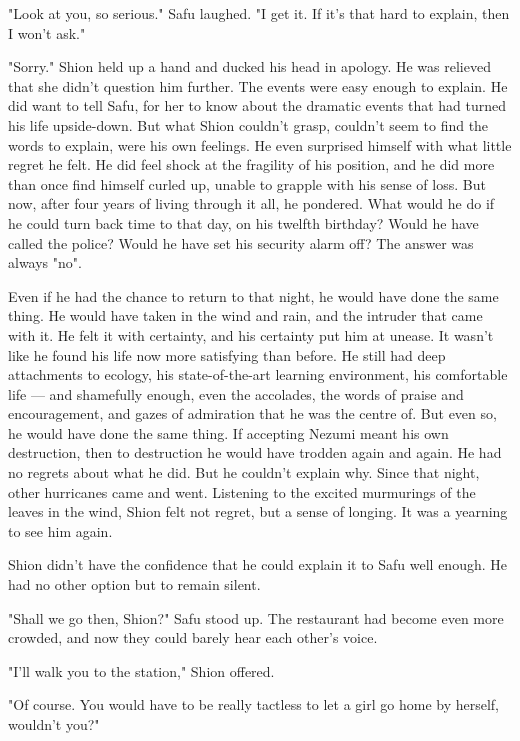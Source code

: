 \myspace

"Look at you, so serious." Safu laughed. "I get it. If it's that hard to
explain, then I won't ask."

"Sorry." Shion held up a hand and ducked his head in apology. He was
relieved that she didn't question him further. The events were easy
enough to explain. He did want to tell Safu, for her to know about the
dramatic events that had turned his life upside-down. But what Shion
couldn't grasp, couldn't seem to find the words to explain, were his own
feelings. He even surprised himself with what little regret he felt. He
did feel shock at the fragility of his position, and he did more than
once find himself curled up, unable to grapple with his sense of loss.
But now, after four years of living through it all, he pondered. What
would he do if he could turn back time to that day, on his twelfth
birthday? Would he have called the police? Would he have set his
security alarm off? The answer was always "no".~

Even if he had the chance to return to that night, he would have done
the same thing. He would have taken in the wind and rain, and the
intruder that came with it. He felt it with certainty, and his certainty
put him at unease. It wasn't like he found his life now more satisfying
than before. He still had deep attachments to ecology, his
state-of-the-art learning environment, his comfortable life --- and
shamefully enough, even the accolades, the words of praise and
encouragement, and gazes of admiration that he was the centre of. But
even so, he would have done the same thing. If accepting Nezumi meant
his own destruction, then to destruction he would have trodden again and
again. He had no regrets about what he did. But he couldn't explain why.
Since that night, other hurricanes came and went. Listening to the
excited murmurings of the leaves in the wind, Shion felt not regret, but
a sense of longing. It was a yearning to see him again.

Shion didn't have the confidence that he could explain it to Safu well
enough. He had no other option but to remain silent.

"Shall we go then, Shion?" Safu stood up. The restaurant had become even
more crowded, and now they could barely hear each other's voice.

"I'll walk you to the station," Shion offered.

"Of course. You would have to be really tactless to let a girl go home
by herself, wouldn't you?"

